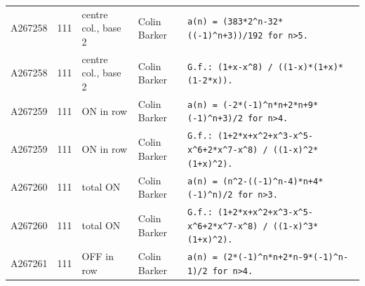 \documentclass[11pt]{article}
\theoremstyle{definition}
\theoremstyle{remark}
\begin{document}
{\begin{longtable}{p{1.3cm}p{0.7cm}p{2.4cm}p{2.3cm}p{7.3cm}}
A267258 & 111 & centre col., base 2 & Colin Barker & \texttt{a(n)\allowbreak{} \allowbreak{}=\allowbreak{} \allowbreak{}(383*\allowbreak{}2\^{}n-\allowbreak{}32*\allowbreak{}((-\allowbreak{}1)\allowbreak{}\^{}n+\allowbreak{}3)\allowbreak{})\allowbreak{}/\allowbreak{}192 \allowbreak{}for \allowbreak{}n>5.} \\
A267258 & 111 & centre col., base 2 & Colin Barker & \texttt{G.f.: \allowbreak{}(1+\allowbreak{}x-\allowbreak{}x\^{}8)\allowbreak{} \allowbreak{}/\allowbreak{} \allowbreak{}((1-\allowbreak{}x)\allowbreak{}*\allowbreak{}(1+\allowbreak{}x)\allowbreak{}*\allowbreak{}(1-\allowbreak{}2*\allowbreak{}x)\allowbreak{})\allowbreak{}.} \\
A267259 & 111 & ON in row & Colin Barker & \texttt{a(n)\allowbreak{} \allowbreak{}=\allowbreak{} \allowbreak{}(-\allowbreak{}2*\allowbreak{}(-\allowbreak{}1)\allowbreak{}\^{}n*\allowbreak{}n+\allowbreak{}2*\allowbreak{}n+\allowbreak{}9*\allowbreak{}(-\allowbreak{}1)\allowbreak{}\^{}n+\allowbreak{}3)\allowbreak{}/\allowbreak{}2 \allowbreak{}for \allowbreak{}n>4.} \\
A267259 & 111 & ON in row & Colin Barker & \texttt{G.f.: \allowbreak{}(1+\allowbreak{}2*\allowbreak{}x+\allowbreak{}x\^{}2+\allowbreak{}x\^{}3-\allowbreak{}x\^{}5-\allowbreak{}x\^{}6+\allowbreak{}2*\allowbreak{}x\^{}7-\allowbreak{}x\^{}8)\allowbreak{} \allowbreak{}/\allowbreak{} \allowbreak{}((1-\allowbreak{}x)\allowbreak{}\^{}2*\allowbreak{}(1+\allowbreak{}x)\allowbreak{}\^{}2)\allowbreak{}.} \\
A267260 & 111 & total ON & Colin Barker & \texttt{a(n)\allowbreak{} \allowbreak{}=\allowbreak{} \allowbreak{}(n\^{}2-\allowbreak{}((-\allowbreak{}1)\allowbreak{}\^{}n-\allowbreak{}4)\allowbreak{}*\allowbreak{}n+\allowbreak{}4*\allowbreak{}(-\allowbreak{}1)\allowbreak{}\^{}n)\allowbreak{}/\allowbreak{}2 \allowbreak{}for \allowbreak{}n>3.} \\
A267260 & 111 & total ON & Colin Barker & \texttt{G.f.: \allowbreak{}(1+\allowbreak{}2*\allowbreak{}x+\allowbreak{}x\^{}2+\allowbreak{}x\^{}3-\allowbreak{}x\^{}5-\allowbreak{}x\^{}6+\allowbreak{}2*\allowbreak{}x\^{}7-\allowbreak{}x\^{}8)\allowbreak{} \allowbreak{}/\allowbreak{} \allowbreak{}((1-\allowbreak{}x)\allowbreak{}\^{}3*\allowbreak{}(1+\allowbreak{}x)\allowbreak{}\^{}2)\allowbreak{}.} \\
A267261 & 111 & OFF in row & Colin Barker & \texttt{a(n)\allowbreak{} \allowbreak{}=\allowbreak{} \allowbreak{}(2*\allowbreak{}(-\allowbreak{}1)\allowbreak{}\^{}n*\allowbreak{}n+\allowbreak{}2*\allowbreak{}n-\allowbreak{}9*\allowbreak{}(-\allowbreak{}1)\allowbreak{}\^{}n-\allowbreak{}1)\allowbreak{}/\allowbreak{}2 \allowbreak{}for \allowbreak{}n>4.} \\

\end{longtable}}
\end{document}
